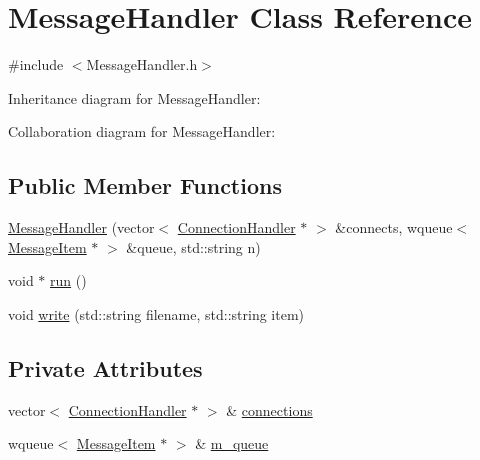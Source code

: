 \hypertarget{classMessageHandler}{\section{Message\+Handler Class Reference}
\label{classMessageHandler}
}


{\ttfamily \#include $<$Message\+Handler.\+h$>$}



Inheritance diagram for Message\+Handler\+:


Collaboration diagram for Message\+Handler\+:
\subsection*{Public Member Functions}
\begin{DoxyCompactItemize}
\item 
\hyperlink{classMessageHandler_a3fbae921d31070e699fdc781febdd468}{Message\+Handler} (vector$<$ \hyperlink{classConnectionHandler}{Connection\+Handler} $\ast$ $>$ \&connects, wqueue$<$ \hyperlink{classMessageItem}{Message\+Item} $\ast$ $>$ \&queue, std\+::string n)
\item 
void $\ast$ \hyperlink{classMessageHandler_a83fd9c104a2dd1a831130ec7a93719ab}{run} ()
\item 
void \hyperlink{classMessageHandler_afc85c0584117622926805f559f19bd06}{write} (std\+::string filename, std\+::string item)
\end{DoxyCompactItemize}
\subsection*{Private Attributes}
\begin{DoxyCompactItemize}
\item 
vector$<$ \hyperlink{classConnectionHandler}{Connection\+Handler} $\ast$ $>$ \& \hyperlink{classMessageHandler_afa53d2ec50ed4c6d9db5b47d1d10ee21}{connections}
\item 
wqueue$<$ \hyperlink{classMessageItem}{Message\+Item} $\ast$ $>$ \& \hyperlink{classMessageHandler_a38e2fbf09216eacac420ef29c91b546f}{m\+\_\+queue}
\end{DoxyCompactItemize}


